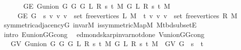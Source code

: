 \begin{isabellebody}
\ \ \isanewline
\ \ \ \ {\isachardoublequoteopen}G{\isachardot}{\kern0pt}E\ {\isacharparenleft}{\kern0pt}G{\isachardot}{\kern0pt}union\ {\isacharparenleft}{\kern0pt}G{}\ G\ {\isacharparenleft}{\kern0pt}G{}\ L\ R\ s\ t\ M{\isacharparenright}{\kern0pt}{\isacharparenright}{\kern0pt}\ {\isacharparenleft}{\kern0pt}G{}\ L\ R\ s\ t\ M{\isacharparenright}{\kern0pt}{\isacharparenright}{\kern0pt}\ {\isacharequal}{\kern0pt}\isanewline
\ \ \ \ \ G{\isachardot}{\kern0pt}E\ G\ {\isasymunion}\ {\isacharbraceleft}{\kern0pt}{\isacharbraceleft}{\kern0pt}s{\isacharcomma}{\kern0pt}\ v{\isacharbraceright}{\kern0pt}\ {\isacharbar}{\kern0pt}v{\isachardot}{\kern0pt}\ v\ {\isasymin}\ set\ {\isacharparenleft}{\kern0pt}free{\isacharunderscore}{\kern0pt}vertices\ L\ M{\isacharparenright}{\kern0pt}{\isacharbraceright}{\kern0pt}\ {\isasymunion}\ {\isacharbraceleft}{\kern0pt}{\isacharbraceleft}{\kern0pt}t{\isacharcomma}{\kern0pt}\ v{\isacharbraceright}{\kern0pt}\ {\isacharbar}{\kern0pt}v{\isachardot}{\kern0pt}\ v\ {\isasymin}\ set\ {\isacharparenleft}{\kern0pt}free{\isacharunderscore}{\kern0pt}vertices\ R\ M{\isacharparenright}{\kern0pt}{\isacharbraceright}{\kern0pt}{\isachardoublequoteclose}\isanewline
%
\isadelimproof
\ \ %
\endisadelimproof
%
\isatagproof
{}\isamarkupfalse%
\ symmetric{\isacharunderscore}{\kern0pt}adjacency{\isacharunderscore}{\kern0pt}G\ invar{\isacharunderscore}{\kern0pt}M\ is{\isacharunderscore}{\kern0pt}symmetric{\isacharunderscore}{\kern0pt}Map{\isacharunderscore}{\kern0pt}M\ M{\isacharunderscore}{\kern0pt}tbd{\isacharunderscore}{\kern0pt}subset{\isacharunderscore}{\kern0pt}E\isanewline
\ \ \isamarkupfalse%
\ {\isacharparenleft}{\kern0pt}intro\ E{\isacharunderscore}{\kern0pt}union{\isacharunderscore}{\kern0pt}G{}{\isacharunderscore}{\kern0pt}G{}{\isacharunderscore}{\kern0pt}cong{\isacharparenright}{\kern0pt}%
\endisatagproof
{\isafoldproof}%
%
\isadelimproof
\isanewline
%
\endisadelimproof
\isanewline
{}\isamarkupfalse%
\ {\isacharparenleft}{\kern0pt}\ edmonds{\isacharunderscore}{\kern0pt}karp{\isacharunderscore}{\kern0pt}invar{\isacharunderscore}{\kern0pt}not{\isacharunderscore}{\kern0pt}done{\isacharunderscore}{\kern0pt}{}{\isacharparenright}{\kern0pt}\ V{\isacharunderscore}{\kern0pt}union{\isacharunderscore}{\kern0pt}G{}{\isacharunderscore}{\kern0pt}G{}{\isacharunderscore}{\kern0pt}cong{\isacharcolon}{\kern0pt}\isanewline
\ \ \ {\isachardoublequoteopen}G{\isachardot}{\kern0pt}V\ {\isacharparenleft}{\kern0pt}G{\isachardot}{\kern0pt}union\ {\isacharparenleft}{\kern0pt}G{}\ G\ {\isacharparenleft}{\kern0pt}G{}\ L\ R\ s\ t\ M{\isacharparenright}{\kern0pt}{\isacharparenright}{\kern0pt}\ {\isacharparenleft}{\kern0pt}G{}\ L\ R\ s\ t\ M{\isacharparenright}{\kern0pt}{\isacharparenright}{\kern0pt}\ {\isacharequal}{\kern0pt}\ G{\isachardot}{\kern0pt}V\ G\ {\isasymunion}\ {\isacharbraceleft}{\kern0pt}s{\isacharbraceright}{\kern0pt}\ {\isasymunion}\ {\isacharbraceleft}{\kern0pt}t{\isacharbraceright}{\kern0pt}{\isachardoublequoteclose}\isanewline

\end{isabellebody}
